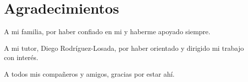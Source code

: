 
\chapter{Agradecimientos}

A mi familia, por haber confiado en mi y haberme apoyado siempre.

\vspace{5mm}
\noindent
A mi tutor, Diego Rodríguez-Losada, por haber orientado y dirigido mi trabajo con interés.

\vspace{5mm}
\noindent
A todos mis compañeros y amigos, gracias por estar ahí.